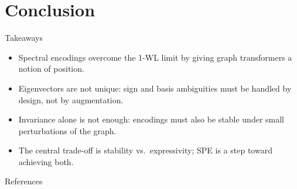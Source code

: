 \documentclass[aspectratio=169,11pt]{beamer}
\begin{document}
\section{Conclusion}

\begin{frame}{Takeaways}
  \begin{itemize}
    \item Spectral encodings overcome the 1-WL limit by giving graph
          transformers a notion of position.
    \item Eigenvectors are not unique: \alert{sign} and \alert{basis}
          ambiguities must be handled by design, not by augmentation.
    \item Invariance alone is not enough: encodings must also be
          \alert{stable} under small perturbations of the graph.
    \item The central trade-off is \alert{stability vs.\ expressivity}; SPE is
          a step toward achieving both.
  \end{itemize}
\end{frame}

\begin{frame}[allowframebreaks]{References}
  \footnotesize
  
  
\end{frame}
\end{document}
